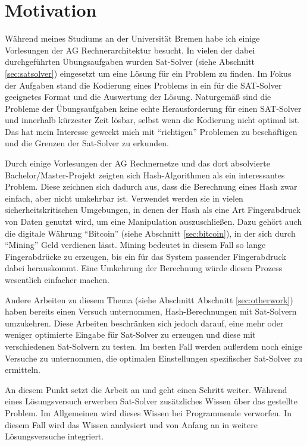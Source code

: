 \section{Motivation}

Während meines Studiums an der Universität Bremen habe ich einige Vorlesungen der AG Rechnerarchitektur besucht.
In vielen der dabei durchgeführten Übungsaufgaben wurden Sat-Solver (siehe Abschnitt \ref{sec:satsolver}) eingesetzt
um eine Lösung für ein Problem zu finden. Im Fokus der Aufgaben stand die Kodierung eines Problems in ein für die
SAT-Solver geeignetes Format und die Auswertung der Lösung. Naturgemäß sind die Probleme der Übungsaufgaben keine
echte Herausforderung für einen SAT-Solver und innerhalb kürzester Zeit lösbar, selbst wenn die Kodierung nicht optimal
ist. Das hat mein Interesse geweckt mich mit "`richtigen"' Problemen zu beschäftigen und die Grenzen der Sat-Solver
zu erkunden.

Durch einige Vorlesungen der AG Rechnernetze und das dort absolvierte Bachelor/Master-Projekt zeigten sich Hash-Algorithmen
als ein interessantes Problem. Diese zeichnen sich dadurch aus, dass die Berechnung eines Hash zwar einfach, aber nicht
umkehrbar ist. Verwendet werden sie in vielen sicherheitskritischen Umgebungen, in denen der Hash als eine Art Fingerabdruck
von Daten genutzt wird, um eine Manipulation auszuschließen. Dazu gehört auch die digitale Währung "`Bitcoin"' (siehe Abschnitt
\ref{sec:bitcoin}), in der sich durch "`Mining"' Geld verdienen lässt. Mining bedeutet in diesem Fall so lange Fingerabdrücke
zu erzeugen, bis ein für das System passender Fingerabdruck dabei herauskommt. Eine Umkehrung der Berechnung würde diesen
Prozess wesentlich einfacher machen.

Andere Arbeiten zu diesem Thema (siehe Abschnitt Abschnitt \ref{sec:otherwork}) haben bereits einen Versuch unternommen,
Hash-Berechnungen mit Sat-Solvern umzukehren. Diese Arbeiten beschränken sich jedoch darauf, eine mehr oder weniger optimierte
Eingabe für Sat-Solver zu erzeugen und diese mit verschiedenen Sat-Solvern zu testen. Im besten Fall werden außerdem noch
einige Versuche zu unternommen, die optimalen Einstellungen spezifischer Sat-Solver zu ermitteln.

An diesem Punkt setzt die Arbeit an und geht einen Schritt weiter. Während eines Lösungsversuch erwerben Sat-Solver zusätzliches
Wissen über das gestellte Problem. Im Allgemeinen wird dieses Wissen bei Programmende verworfen. In diesem Fall wird das Wissen
analysiert und von Anfang an in weitere Lösungsversuche integriert.